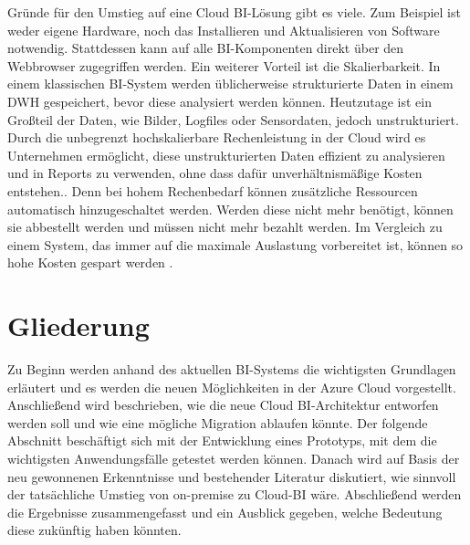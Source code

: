 Gründe für den Umstieg auf eine Cloud BI-Lösung gibt es viele. Zum Beispiel ist weder eigene Hardware, noch das Installieren und Aktualisieren von Software notwendig. Stattdessen kann auf alle BI-Komponenten direkt über den Webbrowser zugegriffen werden. Ein weiterer Vorteil ist die Skalierbarkeit. In einem klassischen BI-System werden üblicherweise strukturierte Daten in einem DWH gespeichert, bevor diese analysiert werden können. Heutzutage ist ein Großteil der Daten, wie Bilder, Logfiles oder Sensordaten, jedoch unstrukturiert. Durch die unbegrenzt hochskalierbare Rechenleistung in der Cloud wird es Unternehmen ermöglicht, diese unstrukturierten Daten effizient zu analysieren und in Reports zu verwenden, ohne dass dafür unverhältnismäßige Kosten entstehen.\cite{gurjar_cloud_2013}. Denn bei hohem Rechenbedarf können zusätzliche Ressourcen automatisch hinzugeschaltet werden. Werden diese nicht mehr benötigt, können sie abbestellt werden und müssen nicht mehr bezahlt werden. Im Vergleich zu einem System, das immer auf die maximale Auslastung vorbereitet ist, können so hohe Kosten gespart werden \cite{ouf_cloud_2011}.


\section{Gliederung}
\label{sec:intro:structure}
Zu Beginn werden anhand des aktuellen BI-Systems die wichtigsten Grundlagen erläutert und es werden die neuen Möglichkeiten in der Azure Cloud vorgestellt. Anschließend wird beschrieben, wie die neue Cloud BI-Architektur entworfen werden soll und wie eine mögliche Migration ablaufen könnte. Der folgende Abschnitt beschäftigt sich mit der Entwicklung eines Prototyps, mit dem die wichtigsten Anwendungsfälle getestet werden können. Danach wird auf Basis der neu gewonnenen Erkenntnisse und bestehender Literatur diskutiert, wie sinnvoll der tatsächliche Umstieg von on-premise zu Cloud-BI wäre. Abschließend werden die Ergebnisse zusammengefasst und ein Ausblick gegeben, welche Bedeutung diese zukünftig haben könnten.